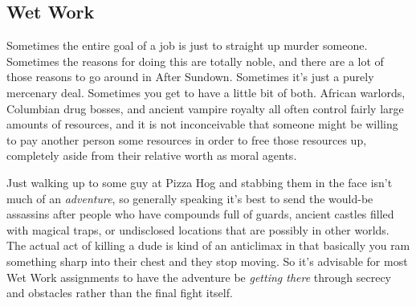\subsection{Wet Work}

Sometimes the entire goal of a job is just to straight up murder someone. Sometimes the reasons for doing this are totally noble, and there are a lot of those reasons to go around in After Sundown. Sometimes it's just a purely mercenary deal. Sometimes you get to have a little bit of both. African warlords, Columbian drug bosses, and ancient vampire royalty all often control fairly large amounts of resources, and it is not inconceivable that someone might be willing to pay another person some resources in order to free those resources up, completely aside from their relative worth as moral agents.

Just walking up to some guy at Pizza Hog and stabbing them in the face isn't much of an \textit{adventure}, so generally speaking it's best to send the would-be assassins after people who have compounds full of guards, ancient castles filled with magical traps, or undisclosed locations that are possibly in other worlds. The actual act of killing a dude is kind of an anticlimax in that basically you ram something sharp into their chest and they stop moving. So it's advisable for most Wet Work assignments to have the adventure be \textit{getting there} through secrecy and obstacles rather than the final fight itself.
